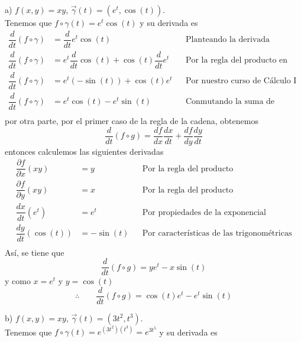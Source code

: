 \documentclass[letterpaper]{article}
\renewcommand{\d}{\partial}
\renewcommand{\*}{\cdot}
\theoremstyle{definition}
\begin{document}
a) $f(x,y) = xy$, $\vec{\gamma}(t) =(e^t, \cos(t)) $.\\
Tenemos que $  f \circ \gamma(t) = e^t\cos(t) $ y su derivada es 
\begin{align*}
	\dfrac{d}{dt} (f\circ \gamma) &= \dfrac{d}{dt}e^t\cos(t) &&\text{Planteando la derivada}\\
	\dfrac{d}{dt} (f\circ \gamma) &= e^t\dfrac{d}{dt}\cos(t) + \cos(t)\dfrac{d}{dt}e^t &&\text{Por la regla del producto en derivadas}\\
	\dfrac{d}{dt} (f\circ \gamma) &= e^t(- \sin(t)) + \cos(t)e^t &&\text{Por nuestro curso de Cálculo I}\\
	\dfrac{d}{dt} (f\circ \gamma) &= e^t\cos(t) - e^t \sin(t) &&\text{Conmutando la suma de funciones}\\
\end{align*}
por otra parte, por el primer caso de la regla de la cadena, obtenemos
\[ 	\dfrac{d}{dt}(f\circ g) = 	\dfrac{df}{dx}\dfrac{dx}{dt} + \dfrac{df}{dy}\dfrac{dy}{dt} \]
entonces calculemos las siguientes derivadas
\begin{align*}
	\dfrac{\d f}{\d x}(xy) &= y &&\text{Por la regla del producto}\\
	\dfrac{\d f}{\d y}(xy) &= x &&\text{Por la regla del producto}\\
	\dfrac{dx}{dt}(e^t) &= e^t &&\text{Por propiedades de la exponencial}\\
	\dfrac{dy}{dt}(\cos(t)) &= -\sin(t) &&\text{Por características de las trigonométricas}\\
\end{align*}
Así, se tiene que 
\[ \dfrac{d}{dt}(f\circ g) = ye^t - x\sin(t) \] y como $ x = e^t $ y $ y = \cos(t) $
\[ \therefore  \qquad \dfrac{d}{dt}(f\circ g) = \cos(t)e^t-e^t\sin(t) \]


b) $f(x,y) = xy$, $\vec{\gamma}(t) =(3t^2, t^3) $.\\

Tenemos que $  f \circ \gamma(t) = e^{(3t^2)(t^3)} = e^{3t^5}  $ y su derivada es 
\end{document}
